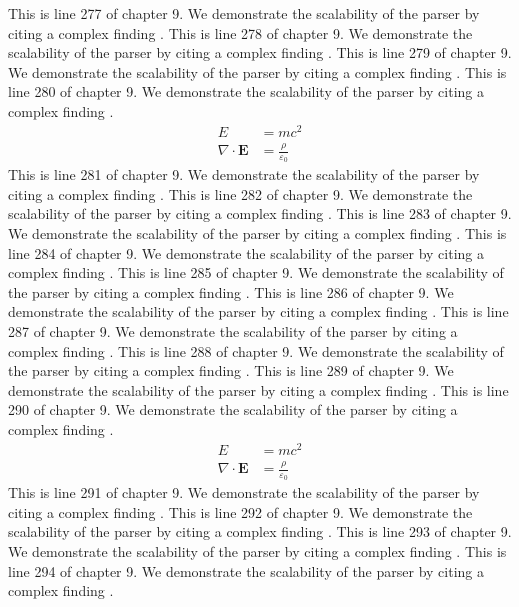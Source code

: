 This is line 277 of chapter 9. We demonstrate the scalability of the parser by citing a complex finding \cite{ref9_277}.
This is line 278 of chapter 9. We demonstrate the scalability of the parser by citing a complex finding \cite{ref9_278}.
This is line 279 of chapter 9. We demonstrate the scalability of the parser by citing a complex finding \cite{ref9_279}.
This is line 280 of chapter 9. We demonstrate the scalability of the parser by citing a complex finding \cite{ref9_280}.
\begin{align*}
  E &= mc^2 \\
  \nabla \cdot \mathbf{E} &= \frac{\rho}{\varepsilon_0}
\end{align*}
This is line 281 of chapter 9. We demonstrate the scalability of the parser by citing a complex finding \cite{ref9_281}.
This is line 282 of chapter 9. We demonstrate the scalability of the parser by citing a complex finding \cite{ref9_282}.
This is line 283 of chapter 9. We demonstrate the scalability of the parser by citing a complex finding \cite{ref9_283}.
This is line 284 of chapter 9. We demonstrate the scalability of the parser by citing a complex finding \cite{ref9_284}.
This is line 285 of chapter 9. We demonstrate the scalability of the parser by citing a complex finding \cite{ref9_285}.
This is line 286 of chapter 9. We demonstrate the scalability of the parser by citing a complex finding \cite{ref9_286}.
This is line 287 of chapter 9. We demonstrate the scalability of the parser by citing a complex finding \cite{ref9_287}.
This is line 288 of chapter 9. We demonstrate the scalability of the parser by citing a complex finding \cite{ref9_288}.
This is line 289 of chapter 9. We demonstrate the scalability of the parser by citing a complex finding \cite{ref9_289}.
This is line 290 of chapter 9. We demonstrate the scalability of the parser by citing a complex finding \cite{ref9_290}.
\begin{align*}
  E &= mc^2 \\
  \nabla \cdot \mathbf{E} &= \frac{\rho}{\varepsilon_0}
\end{align*}
This is line 291 of chapter 9. We demonstrate the scalability of the parser by citing a complex finding \cite{ref9_291}.
This is line 292 of chapter 9. We demonstrate the scalability of the parser by citing a complex finding \cite{ref9_292}.
This is line 293 of chapter 9. We demonstrate the scalability of the parser by citing a complex finding \cite{ref9_293}.
This is line 294 of chapter 9. We demonstrate the scalability of the parser by citing a complex finding \cite{ref9_294}.
